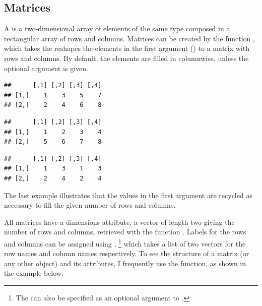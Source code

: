 \documentclass[11pt]{book}
\renewenvironment{knitrout}{\small\renewcommand{\baselinestretch}{.85}}{} %
\begin{document}
\subsection{Matrices}
A  is a two-dimensional array of elements of the same type composed
in a rectangular array of rows and columns. Matrices can be created by the function
, which takes the reshapes the elements in 
the first argument () to a matrix with  rows and
 columns. By default, the elements are filled in columnwise, unless
the optional argument  is given.

\begin{knitrout}
\color{fgcolor}\begin{kframe}
\begin{alltt}
 \hlkwb{<-} \hlstd{(}\hlopt{:}\hlstd{,} \hlstd{=}\hlstd{,} \hlstd{=}\hlstd{))}
\end{alltt}
\begin{verbatim}
##      [,1] [,2] [,3] [,4]
## [1,]    1    3    5    7
## [2,]    2    4    6    8
\end{verbatim}
\begin{alltt}
 \hlkwb{<-} \hlstd{(}\hlopt{:}\hlstd{,} \hlstd{=}\hlstd{,} \hlstd{=}\hlstd{,} \hlstd{=}\hlstd{))}
\end{alltt}
\begin{verbatim}
##      [,1] [,2] [,3] [,4]
## [1,]    1    2    3    4
## [2,]    5    6    7    8
\end{verbatim}
\begin{alltt}
 \hlkwb{<-} \hlstd{(}\hlopt{:}\hlstd{,} \hlstd{=}\hlstd{,} \hlstd{=}\hlstd{))}
\end{alltt}
\begin{verbatim}
##      [,1] [,2] [,3] [,4]
## [1,]    1    3    1    3
## [2,]    2    4    2    4
\end{verbatim}
\end{kframe}
\end{knitrout}
\noindent The last example illustrates that the values in the first argument are recycled
as necessary to fill the given number of rows and columns.

All matrices have a dimensions attribute, a vector of length two giving the number
of rows and columns, retrieved with the function . Labels for the rows and
columns can be assigned using ,%
\footnote{
The  can also be specified as an optional argument to .
}
which takes a list of two vectors for the
row names and column names respectively. To see the structure of a matrix
(or any other \R object) and its attributes, I frequently use the  function,
as shown in the example below.
\end{document}

